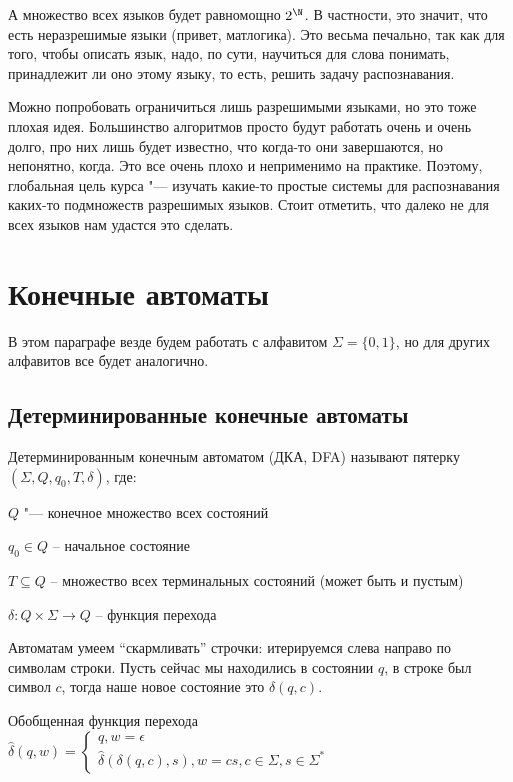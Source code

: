 А множество всех языков будет равномощно $2^\N$. В частности, это значит, что есть неразрешимые языки (привет, матлогика). 
Это весьма печально, так как для того, чтобы описать язык, надо, по сути, научиться для слова понимать, принадлежит ли оно этому языку, то есть, решить задачу распознавания.

Можно попробовать ограничиться лишь разрешимыми языками, но это тоже плохая идея. 
Большинство алгоритмов просто будут работать очень и очень долго, про них лишь будет известно, что когда-то они завершаются, но непонятно, когда. Это все очень плохо и неприменимо на практике.
Поэтому, глобальная цель курса "--- изучать какие-то простые системы для распознавания каких-то подмножеств разрешимых языков. 
Стоит отметить, что далеко не для всех языков нам удастся это сделать.


\chapter{Конечные автоматы}
В этом параграфе везде будем работать с алфавитом $\Sigma = \{0, 1\}$, но для других алфавитов все будет аналогично.
\section{Детерминированные конечные автоматы}
\begin{Def}
Детерминированным конечным автоматом (ДКА, DFA) называют пятерку $(\Sigma, Q, q_0, T, \delta)$, где:

$Q$ "--- конечное множество всех состояний

$q_0 \in Q$ -- начальное состояние

$T \subseteq Q$ -- множество всех терминальных состояний (может быть и пустым)

$\delta: Q \times \Sigma \to Q$ -- функция перехода

Автоматам умеем ``скармливать'' строчки: итерируемся слева направо по символам строки. 
Пусть сейчас мы находились в состоянии $q$, в строке был символ $c$, тогда наше новое состояние это $\delta(q, c)$.
\end{Def}

\begin{Def}
Обобщенная функция перехода $\hat \delta(q, w) =     
    \begin{cases}
        q, w = \epsilon \\
        \hat \delta(\delta(q, c), s), w = cs, c \in \Sigma, s \in \Sigma^*
    \end{cases}
$
\end{Def}

